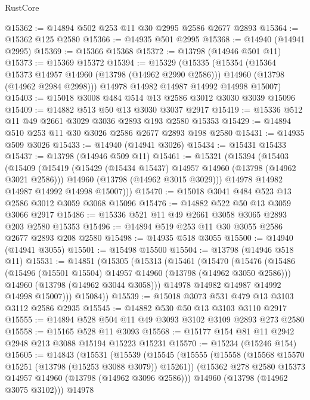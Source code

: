 \begin{lexlean}{RustCore}
\begin{coremodule}
@15362 := @14894 @502 @253 @11 @30 @2995 @2586 @2677 @2893
@15364 := @15362 @125 @2580
@15366 := @14935 @501 @2995
@15368 := @14940 (@14941 @2995)
@15369 := @15366 @15368
@15372 := @13798 (@14946 @501 @11)
@15373 := @15369 @15372
@15394 := @15329
    (@15335
      (@15354
        (@15364 @15373 @14957 @14960 (@13798 (@14962 @2990 @2586)))
        @14960
        (@13798 (@14962 @2984 @2998)))
      @14978
      @14982
      @14987
      @14992
      @14998
      @15007)
@15403 := @15018 @3008 @484 @514 @13 @2586 @3012 @3030 @3039 @15096
@15409 := @14882 @513 @50 @13 @3030 @3037 @2917
@15419 := @15336 @512 @11 @49 @2661 @3029 @3036 @2893 @193 @2580 @15353
@15429 := @14894 @510 @253 @11 @30 @3026 @2586 @2677 @2893 @198 @2580
@15431 := @14935 @509 @3026
@15433 := @14940 (@14941 @3026)
@15434 := @15431 @15433
@15437 := @13798 (@14946 @509 @11)
@15461 := @15321
    (@15394
      (@15403
        (@15409
          (@15419
            (@15429 (@15434 @15437) @14957 @14960 (@13798 (@14962 @3021 @2586)))
            @14960
            (@13798 (@14962 @3015 @3029)))
          @14978
          @14982
          @14987
          @14992
          @14998
          @15007)))
@15470 := @15018 @3041 @484 @523 @13 @2586 @3012 @3059 @3068 @15096
@15476 := @14882 @522 @50 @13 @3059 @3066 @2917
@15486 := @15336 @521 @11 @49 @2661 @3058 @3065 @2893 @203 @2580 @15353
@15496 := @14894 @519 @253 @11 @30 @3055 @2586 @2677 @2893 @208 @2580
@15498 := @14935 @518 @3055
@15500 := @14940 (@14941 @3055)
@15501 := @15498 @15500
@15504 := @13798 (@14946 @518 @11)
@15531 := @14851
    (@15305
      (@15313
        (@15461
          (@15470
            (@15476
              (@15486
                (@15496 (@15501 @15504) @14957 @14960 (@13798 (@14962 @3050 @2586)))
                @14960
                (@13798 (@14962 @3044 @3058)))
              @14978
              @14982
              @14987
              @14992
              @14998
              @15007)))
        @15084))
@15539 := @15018 @3073 @531 @479 @13 @3103 @3112 @2586 @2935
@15545 := @14882 @530 @50 @13 @3103 @3110 @2917
@15555 := @14894 @528 @504 @11 @49 @3093 @3102 @3109 @2893 @273 @2580
@15558 := @15165 @528 @11 @3093
@15568 := @15177 @154 @81 @11 @2942 @2948 @213 @3088 @15194 @15223 @15231
@15570 := @15234 (@15246 @154)
@15605 := @14843
    (@15531
      (@15539
        (@15545
          (@15555
            (@15558 (@15568 @15570 @15251 (@13798 (@15253 @3088 @3079)) @15261))
            (@15362 @278 @2580 @15373 @14957 @14960 (@13798 (@14962 @3096 @2586)))
            @14960
            (@13798 (@14962 @3075 @3102)))
          @14978

\end{coremodule}
\end{lexlean}
